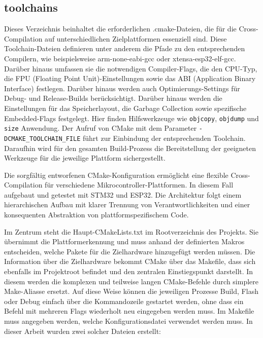 \subsection*{toolchains}
Dieses Verzeichnis beinhaltet die erforderlichen .cmake-Dateien, die für die Cross-Compilation auf unterschiedlichen Zielplattformen essenziell sind.
Diese Toolchain-Dateien definieren unter anderem die Pfade zu den entsprechenden Compilern, wie beispielsweise arm-none-eabi-gcc oder xtensa-esp32-elf-gcc. Darüber hinaus umfassen sie die notwendigen Compiler-Flags, die den CPU-Typ, die FPU (Floating Point Unit)-Einstellungen sowie das ABI (Application Binary Interface) festlegen. 
Darüber hinaus werden auch Optimierungs-Settings für Debug- und Release-Builds berücksichtigt. Darüber hinaus werden die Einstellungen für das Speicherlayout, die Garbage Collection sowie spezifische Embedded-Flags festgelegt. 
Hier finden Hilfswerkzeuge wie \texttt{objcopy}, \texttt{objdump} und \texttt{size} Anwendung.
Der Aufruf von CMake mit dem Parameter \texttt{-DCMAKE\_TOOLCHAIN\_FILE} führt zur Einbindung der entsprechenden Toolchain. 
Daraufhin wird für den gesamten Build-Prozess die Bereitstellung der geeigneten Werkzeuge für die jeweilige Plattform sichergestellt.

\vspace{0.5cm}
\vspace{0.5cm}

Die sorgfältig entworfenen CMake-Konfiguration ermöglicht eine flexible Cross-Compilation für verschiedene Mikrocontroller-Plattformen.
In diesem Fall aufgebaut und getestet mit STM32 und ESP32. 
Die Architektur folgt einem hierarchischen Aufbau mit klarer Trennung von Verantwortlichkeiten und einer konsequenten Abstraktion von plattformspezifischem Code.

Im Zentrum steht die Haupt-CMakeLists.txt im Rootverzeichnis des Projekts. 
Sie übernimmt die Plattformerkennung und muss anhand der definierten Makros entscheiden, welche Pakete für die Zielhardware hinzugefügt werden müssen. 
Die Information über die Zielhardware bekommt CMake über das Makefile, dass sich ebenfalls im Projektroot befindet und den zentralen Einstiegspunkt darstellt.
In diesem werden die komplexen und teilweise langen CMake-Befehle durch simplere Make-Aliasse ersetzt.
Auf diese Weise können die jeweiligen Prozesse Build, Flash oder Debug einfach über die Kommandozeile gestartet werden, ohne dass ein Befehl mit mehreren Flags wiederholt neu eingegeben werden muss. 
Im Makefile muss angegeben werden, welche Konfigurationsdatei verwendet werden muss.
In dieser Arbeit wurden zwei solcher Dateien erstellt:


